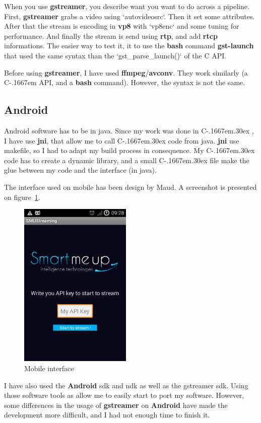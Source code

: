 \documentclass[a4paper,11pt]{custom}
\newcommand{\rtp}{\textbf{rtp}\xspace}
\newcommand{\rtcp}{\textbf{rtcp}\xspace}
\newcommand{\avconv}{\textbf{avconv}\xspace}
\newcommand{\ffmpeg}{\textbf{ffmpeg}\xspace}
\newcommand{\gstreamer}{\textbf{gstreamer}\xspace}
\newcommand{\vpx}{\textbf{vp8}\xspace}
\newcommand{\jni}{\textbf{jni}\xspace}
\newcommand{\bash}{\textbf{bash}\xspace}
\newcommand{\command}[1]{\textbf{#1}\xspace}
\newcommand{\android}{\textbf{Android}\xspace}
\newcommand{\cpp}{%
  C\kern-.1667em\raise.30ex\hbox{\smaller{++}}%
  \spacefactor1000\xspace%
}
\newcommand{\clang}{%
  C\kern-.1667em%
  \xspace%
}
\begin{document}
When you use \gstreamer, you describe want you want to do across a pipeline.
First, \gstreamer grabs a video using `autovideosrc`. Then it set some
attributes. After that the stream is encoding in \vpx with `vp8enc` and some
tuning for performance. And finally the stream is send
using \rtp, and add \rtcp informations. The easier way to test it, it to use the
\bash command \command{gst-launch} that used the same syntax than
the `gst\_parse\_launch()` of the C API.

Before using \gstreamer, I have used \ffmpeg/\avconv. They work similarly (a
\clang API, and a \bash command). However, the syntax is not the same.

\subsection{Android}

Android software has to be in java. Since my work was done in \cpp, I have use
\jni, that allow me to call \cpp code from java. \jni use makefile, so I had to
adapt my build process in consequence. My \cpp code has to create a dynamic
library, and a small \cpp file make the glue between my code and the interface
(in java).

The interface used on mobile has been design by Maud. A screenshot is presented
on figure~\ref{fig:smumobile}.

\begin{figure}
\centering
\includegraphics[height=8cm]{smu_mobile.jpg}
\caption{Mobile interface}
\label{fig:smumobile}
\end{figure}

I have also used the \android{} sdk and ndk as well as the gstreamer sdk. Using
those software tools as allow me to easily start to port my software. However,
some differences in the usage of \gstreamer{} on \android{} have made the
development more difficult, and I had not enough time to finish it.
\end{document}
